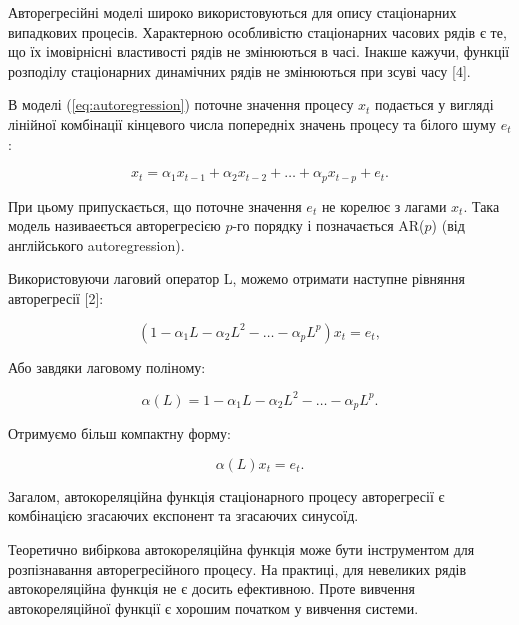 Авторегресійні моделі широко використовуються для опису стаціонарних випадкових процесів. Характерною особливістю стаціонарних часових рядів є те, що їх імовірнісні властивості рядів не змінюються в часі. Інакше кажучи, функції розподілу стаціонарних динамічних рядів не змінюються при зсуві часу [4].

В моделі (\ref{eq:autoregression}) поточне значення процесу $x_{t}$ подається у вигляді лінійної комбінації кінцевого числа попередніх значень процесу та білого шуму $e_{t}$:

\begin{equation}\label{eq:autoregression}
x_{t} = \alpha_{1}x_{t-1} + \alpha_{2}x_{t-2} + \dots + \alpha_{p}x_{t-p} + e_{t}.
\end{equation}

\vspace{1.5em}


При цьому припускається, що поточне значення $e_{t}$ не корелює з лагами $x_{t}$. Така модель називаеється авторегресією $p$-го порядку і позначається AR($p$) (від англійського autoregression).

Використовуючи лаговий оператор L, можемо отримати наступне рівняння авторегресії [2]:

\begin{equation}
(1 - \alpha_{1}L - \alpha_{2}L^{2} - \dots - \alpha_{p}L^{p})x_{t} = e_{t},
\end{equation}

\vspace{1.5em}

Або завдяки лаговому поліному:

\begin{equation}
\alpha(L) = 1 - \alpha_{1}L - \alpha_{2}L^{2} - \dots - \alpha_{p}L^{p}.
\end{equation}

\vspace{1.5em}

Отримуємо більш компактну форму:

\begin{equation}\label{eq:arL}
\alpha(L)x_{t} = e_{t}.
\end{equation}

Загалом,  автокореляційна функція стаціонарного процесу авторегресії є комбінацією згасаючих експонент та згасаючих синусоїд.

Теоретично вибіркова автокореляційна функція може бути інструментом для розпізнавання авторегресійного процесу. На практиці, для невеликих рядів автокореляційна функція не є досить ефективною. Проте вивчення автокореляційної функції є хорошим початком у вивчення системи.

